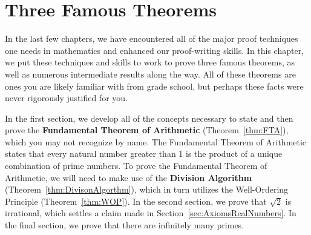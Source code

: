 \chapter{Three Famous Theorems}\label{chap:three famous theorems}


In the last few chapters, we have encountered all of the major proof techniques one needs in mathematics and enhanced our proof-writing skills.  In this chapter, we put these techniques and skills to work to prove three famous theorems, as well as numerous intermediate results along the way.  All of these theorems are ones you are likely familiar with from grade school, but perhaps these facts were never rigorously justified for you. 

In the first section, we develop all of the concepts necessary to state and then prove the \textbf{Fundamental Theorem of Arithmetic} (Theorem~\ref{thm:FTA}), which you may not recognize by name. The Fundamental Theorem of Arithmetic states that every natural number greater than 1 is the product of a unique combination of prime numbers. To prove the Fundamental Theorem of Arithmetic, we will need to make use of the \textbf{Division Algorithm} (Theorem~\ref{thm:DivisonAlgorthm}), which in turn utilizes the Well-Ordering Principle (Theorem~\ref{thm:WOP}). In the second section, we prove that $\sqrt{2}$ is irrational, which settles a claim made in Section~\ref{sec:AxiomsRealNumbers}. In the final section, we prove that there are infinitely many primes.